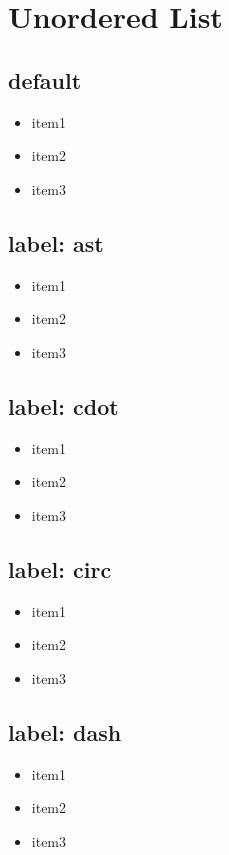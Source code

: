 \documentclass{article}
\begin{document}
	\section*{Unordered List}

	\subsection*{default}
	\begin{itemize}
		\item item1
		\item item2
		\item item3
	\end{itemize}

	\subsection*{label: ast }
	\begin{itemize}[label=$\ast$]
		\item item1
		\item item2
		\item item3
	\end{itemize}

	\subsection*{label: cdot }
	\begin{itemize}[label=$\cdot$]
		\item item1
		\item item2
		\item item3
	\end{itemize}

	\subsection*{label: circ }
	\begin{itemize}[label=$\circ$]
		\item item1
		\item item2
		\item item3
	\end{itemize}

	\subsection*{label: dash }
	\begin{itemize}[label=$-$]
		\item item1
		\item item2
		\item item3
	\end{itemize}
\end{document}
